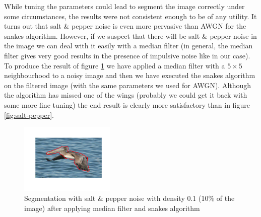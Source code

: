 While tuning the parameters could lead to segment the image correctly under some circumstances, the results were not consistent enough to be of any utility. It turns out that salt \& pepper noise is even more pervasive than AWGN for the snakes algorithm. However, if we suspect that there will be salt \& pepper noise in the image we can deal with it easily with a median filter (in general, the median filter gives very good results in the presence of impulsive noise like in our case). To produce the result of figure \ref{fig:salt-pepper-countermeasures} we have applied a median filter with a $5 \times 5$ neighbourhood to a noisy image and then we have executed the snakes algorithm on the filtered image (with the same parameters we used for AWGN). Although the algorithm has missed one of the wings (probably we could get it back with some more fine tuning) the end result is clearly more satisfactory than in figure \ref{fig:salt-pepper}.

\begin{figure}[!hbt]
\centering

\includegraphics[width=45mm]{img/ex2/saltpepper/0_1_fixed.png}

\caption{Segmentation with salt \& pepper noise with density 0.1 (10\% of the image) after applying median filter and snakes algorithm}
\label{fig:salt-pepper-countermeasures}

\end{figure}

\FloatBarrier